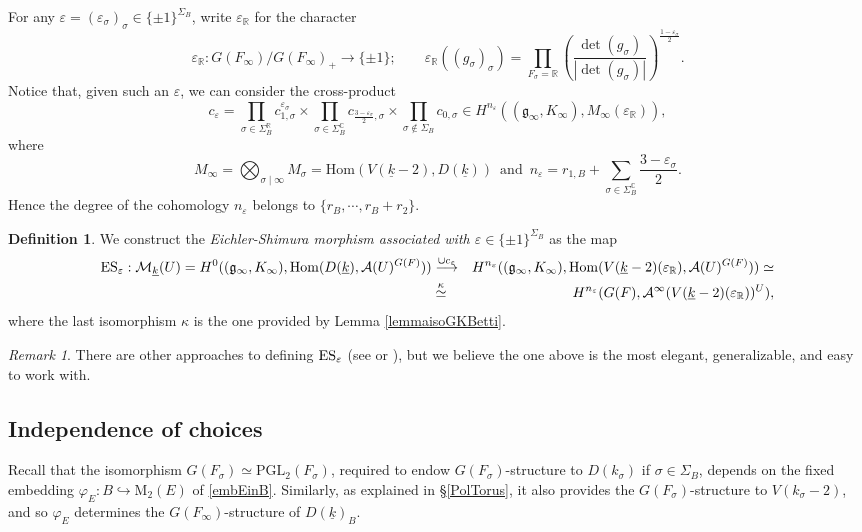 \documentclass{amsart}
\theoremstyle{definition}
\newtheorem{definition}[theorem]{Definition}
\theoremstyle{remark}
\newtheorem{remark}[theorem]{Remark}
\numberwithin{equation}{section}
\newcommand{\M}{\mathrm{M}}
\newcommand{\PGL}{{\mathrm{PGL}}}
\newcommand{\C}{{\mathbb C}}
\newcommand{\R}{{\mathbb R}}
\newcommand{\cA}{{\mathcal A}}
\newcommand{\cM}{{\mathcal M}}
\newcommand{\mfg}{{\mathfrak g}}
\newcommand{\Hom}{{\mathrm {Hom}}}
\begin{document}
For any $\varepsilon=(\varepsilon_\sigma)_\sigma\in \{\pm1\}^{\Sigma_B}$, write $\varepsilon_\R$ for the character
\[
\varepsilon_\R:G(F_\infty)/G(F_\infty)_+\longrightarrow \{\pm 1\};\qquad \varepsilon_\R((g_\sigma)_\sigma)=\prod_{F_\sigma=\R} \left(\frac{\det(g_\sigma)}{|\det(g_\sigma)|}\right)^{\frac{1-\varepsilon_\sigma}{2}}.
\]
Notice that, given such an $\varepsilon$, we can consider the cross-product
\begin{equation}\label{defcvarepsilon}
c_\varepsilon=\prod_{\sigma\in\Sigma_B^\R}c_{1,\sigma}^{\varepsilon_\sigma}\times\prod_{\sigma\in\Sigma_B^\C}c_{\frac{3-\varepsilon_\sigma}{2},\sigma}\times\prod_{\sigma\not\in\Sigma_B}c_{0,\sigma}\in H^{n_\varepsilon}((\mfg_\infty,K_\infty),M_\infty(\varepsilon_\R)),
\end{equation}
where
\[
M_\infty=\bigotimes_{\sigma\mid \infty} M_\sigma=\Hom(V(\underline k-2),D(\underline k))\, \text{ and }\,   
n_\varepsilon=r_{1,B}+\sum_{\sigma\in\Sigma_B^\C}\frac{3-\varepsilon_\sigma}{2}.
\]
Hence the degree of the cohomology $n_\varepsilon$ belongs to $\{r_B,\cdots,r_B+r_2\}$.


\begin{definition}\label{DefES}
We construct the \emph{Eichler-Shimura morphism associated with $\varepsilon\in \{\pm1\}^{\Sigma_B}$} as the map
\begin{eqnarray*}
{\rm ES}_\varepsilon:\cM_{\underline k}(U)=H^0((\mfg_\infty,K_\infty),\Hom(D(\underline k),\cA(U)^{G(F)}))&\stackrel{\cup c_\varepsilon}{\longrightarrow}& H^{n_\varepsilon}((\mfg_\infty,K_\infty),\Hom(V(\underline k-2)(\varepsilon_\R),\cA(U)^{G(F)}))\simeq\\
&\stackrel{\kappa}{\simeq}& H^{n_\varepsilon}(G(F),\cA^\infty(V(\underline k-2)(\varepsilon_\R))^U),
\end{eqnarray*}
where the last isomorphism $\kappa$ is the one provided by Lemma \ref{lemmaisoGKBetti}.
\end{definition}
\begin{remark}
    There are other approaches to defining ${\rm ES}_\varepsilon$ (see \cite{ESsanti} or \cite{preprintsanti2}), but we believe the one above is the most elegant, generalizable, and easy to work with.
\end{remark}


\subsection{Independence of choices}
Recall that the isomorphism $G(F_\sigma)\simeq \PGL_2(F_\sigma)$, required to endow $G(F_\sigma)$-structure to $D(k_\sigma)$  if $\sigma\in\Sigma_B$, depends on the fixed embedding $\varphi_E:B\hookrightarrow\M_2(E)$ of \eqref{embEinB}. Similarly, as explained in \S \ref{PolTorus}, it also provides the $G(F_\sigma)$-structure to $V(k_\sigma-2)$, and so $\varphi_E$ determines the $G(F_\infty)$-structure of $D(\underline k)_B$.
\end{document}
